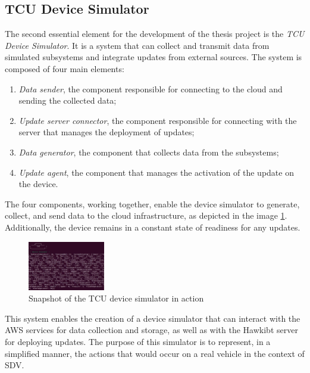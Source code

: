 \documentclass[10pt,a4paper,roman, twocolumn]{article}
\begin{document}
\subsection{TCU Device Simulator}
The second essential element for the development of the thesis project is the \textit{TCU Device Simulator}. It is a system that can collect and transmit data from simulated subsystems and integrate updates from external sources. The system is composed of four main elements:
\begin{enumerate}
	\setlength\itemsep{-0.3em}
	\item \textit{Data sender}, the component responsible for connecting to the cloud and sending the collected data;
	\item \textit{Update server connector}, the component responsible for connecting with the server that manages the deployment of updates;
	\item \textit{Data generator}, the component that collects data from the subsystems;
	\item \textit{Update agent}, the component that manages the activation of the update on the device.
\end{enumerate}

The four components, working together, enable the device simulator to generate, collect, and send data to the cloud infrastructure, as depicted in the image \ref{fig:TCUSimulatorP}. Additionally, the device remains in a constant state of readiness for any updates.
\begin{figure} [tbh]
	\centerline{\includegraphics[width=0.3\textwidth]{images/TCUSimulatorP.png}}
	\caption{Snapshot of the TCU device simulator in action}
	\label{fig:TCUSimulatorP}
\end{figure}

This system enables the creation of a device simulator that can interact with the AWS services for data collection and storage, as well as with the Hawkibt server for deploying updates. The purpose of this simulator is to represent, in a simplified manner, the actions that would occur on a real vehicle in the context of SDV.
\end{document}
